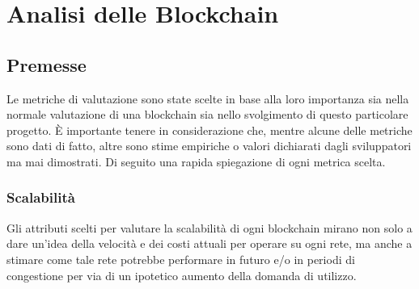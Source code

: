 \documentclass[a4paper, 12pt]{article}
\begin{document}
\makefrontpage

\section{Analisi delle Blockchain}

\subsection*{Premesse}
Le metriche di valutazione sono state scelte in base alla loro importanza sia nella normale valutazione di una blockchain sia nello svolgimento di questo particolare progetto.
È importante tenere in considerazione che, mentre alcune delle metriche sono dati di fatto, altre sono stime empiriche o valori dichiarati dagli sviluppatori ma mai dimostrati.
Di seguito una rapida spiegazione di ogni metrica scelta.

\subsubsection*{Scalabilità}
Gli attributi scelti per valutare la scalabilità di ogni blockchain mirano non solo a dare un'idea della velocità e dei costi attuali per operare su ogni rete, ma anche a stimare come tale
rete potrebbe performare in futuro e/o in periodi di congestione per via di un ipotetico aumento della domanda di utilizzo.
\end{document}
